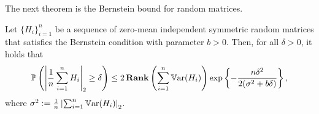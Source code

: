 The next theorem is the Bernstein bound for random matrices.

\begin{theorem}\label{thm:bernstein_matrix}
Let $\{H_i\}_{i=1}^n$ be a sequence of zero-mean independent symmetric random matrices that satisfies the Bernstein condition with parameter $b > 0$.
Then, for all $\delta > 0$, it holds that
\begin{align}
  \operatorname{\mathbb P}\left( \left| \frac1n \sum_{i=1}^n H_i \right|_2 \ge \delta \right) \le 2 \operatorname{\bf Rank}\left(\sum_{i=1}^n \operatorname{\mathbb{V}ar}(H_i)\right) \exp\left\{ -\frac{n\delta^2}{2(\sigma^2 + b\delta)} \right\},
\end{align}
where $\sigma^2 := \frac1n \left| \sum_{i=1}^n \operatorname{\mathbb{V}ar}(H_i) \right|_2$.
\end{theorem}
